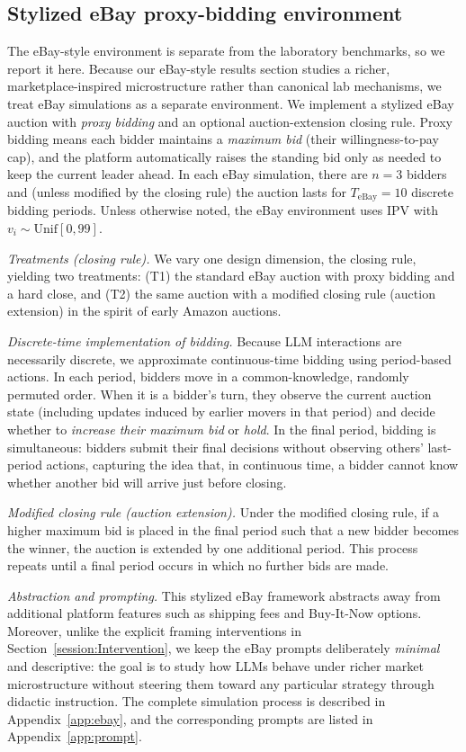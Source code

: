 \documentclass[acmsmall,screen,review]{acmart}
\begin{document}
\subsection{Stylized eBay proxy-bidding environment}\label{app:ebay_env}
The eBay-style environment is separate from the laboratory benchmarks, so we report it here.
Because our eBay-style results section studies a richer, marketplace-inspired microstructure rather than canonical lab mechanisms, we treat eBay simulations as a separate environment. We implement a stylized eBay auction with \emph{proxy bidding} and an optional auction-extension closing rule. Proxy bidding means each bidder maintains a \emph{maximum bid} (their willingness-to-pay cap), and the platform automatically raises the standing bid only as needed to keep the current leader ahead. In each eBay simulation, there are $n=3$ bidders and (unless modified by the closing rule) the auction lasts for $T_{\text{eBay}}=10$ discrete bidding periods. Unless otherwise noted, the eBay environment uses IPV with $v_i \sim \mathrm{Unif}[0,99]$.

\emph{Treatments (closing rule).}
We vary one design dimension, the closing rule, yielding two treatments: (T1) the standard eBay auction with proxy bidding and a hard close, and (T2) the same auction with a modified closing rule (auction extension) in the spirit of early Amazon auctions.

\emph{Discrete-time implementation of bidding.}
Because LLM interactions are necessarily discrete, we approximate continuous-time bidding using period-based actions. In each period, bidders move in a common-knowledge, randomly permuted order. When it is a bidder's turn, they observe the current auction state (including updates induced by earlier movers in that period) and decide whether to \emph{increase their maximum bid} or \emph{hold}. In the final period, bidding is simultaneous: bidders submit their final decisions without observing others' last-period actions, capturing the idea that, in continuous time, a bidder cannot know whether another bid will arrive just before closing.

\emph{Modified closing rule (auction extension).}
Under the modified closing rule, if a higher maximum bid is placed in the final period such that a new bidder becomes the winner, the auction is extended by one additional period. This process repeats until a final period occurs in which no further bids are made.

\emph{Abstraction and prompting.}
This stylized eBay framework abstracts away from additional platform features such as shipping fees and Buy-It-Now options. Moreover, unlike the explicit framing interventions in Section~\ref{session:Intervention}, we keep the eBay prompts deliberately \emph{minimal} and descriptive: the goal is to study how LLMs behave under richer market microstructure without steering them toward any particular strategy through didactic instruction. The complete simulation process is described in Appendix~\ref{app:ebay}, and the corresponding prompts are listed in Appendix~\ref{app:prompt}.
\end{document}

